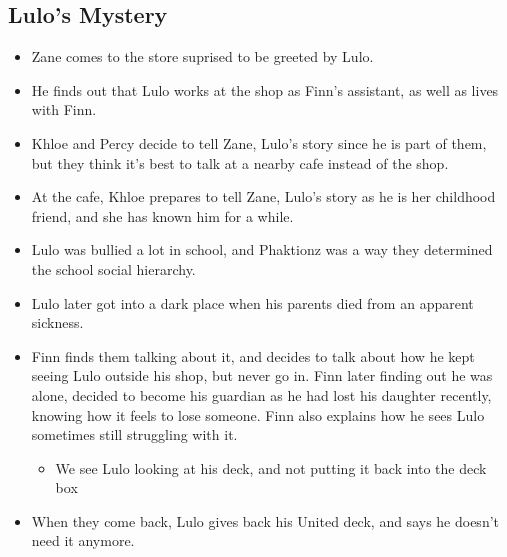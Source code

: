 \subsection{Lulo's Mystery}
\begin{itemize}
	\item Zane comes to the store suprised to be greeted by Lulo.
	\item He finds out that Lulo works at the shop as Finn's assistant, as well as
	      lives with Finn.
	\item Khloe and Percy decide to tell Zane, Lulo's story since he is part of them,
          but they think it's best to talk at a nearby cafe instead of the shop.
    \item At the cafe, Khloe prepares to tell Zane, Lulo's story as he is her 
    childhood friend, and she has known him for a while. 
    \item Lulo was bullied a lot in school, and Phaktionz was a way they determined the school
    social hierarchy. 
    \item Lulo later got into a dark place when his parents died from an apparent sickness.
    \item Finn finds them talking about it, and decides to talk about how he kept seeing Lulo outside his shop, 
    but never go in. Finn later finding out he was alone, decided to become his guardian as he had lost his daughter 
    recently, knowing how it feels to lose someone. Finn also explains how he sees Lulo sometimes still struggling with it.
        \begin{itemize}
            \item We see Lulo looking at his deck, and not putting it back into the deck box
        \end{itemize}
    \item When they come back, Lulo gives back his United deck, and says he doesn't need it anymore. 
\end{itemize}